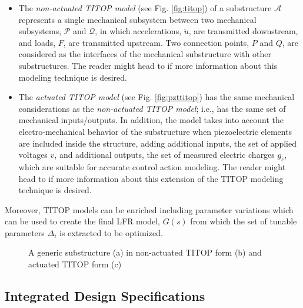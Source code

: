\documentclass{ifacconf}
\begin{document}
\begin{itemize}
\item The \emph{non-actuated TITOP model} (see Fig. \ref{fig:titop}) of a substructure $\mathcal{A}$ represents a single mechanical subsystem between two mechanical subsystems, $\mathcal{P}$ and $\mathcal{Q}$, in which accelerations, $\ddot{u}$, are transmitted downstream, and loads, $F$, are transmitted upstream. Two connection points, $P$ and $Q$, are considered as the interfaces of the mechanical substructure with other substructures. The reader might head to \cite{Perez2015_LM} if more information about this modeling technique is desired.

\item The \emph{actuated TITOP model} (see Fig. \ref{fig:pzttitop}) has the same mechanical considerations as the \emph{non-actuated TITOP model}; i.e., has the same set of mechanical inputs/outputs. In addition, the model takes into account the electro-mechanical behavior of the substructure when piezoelectric elements are included inside the structure, adding additional inputs, the set of applied voltages $v$, and additional outputs, the set of measured electric charges $g_c$, which are suitable for accurate control action modeling. The reader might head to \cite{Perez2016_PEA} if more information about this extension of the TITOP modeling technique is desired.
\end{itemize}

Moreover, TITOP models can be enriched including parameter variations which can be used to create the final LFR model, $G(s)$ from which the set of tunable parameters $\Delta_i$ is extracted to be optimized.

\begin{figure}
\centering
{}
\hfill
\begin{minipage}{.48\linewidth}
\centering
{}
\end{minipage}\begin{minipage}{.48\linewidth}
\centering
{}
\end{minipage}
\caption{A generic substructure (a) in non-actuated TITOP form (b) and actuated TITOP form (c)}
\label{fig:main}
\end{figure}

\subsection{Integrated Design Specifications}
\label{subsec:IDspec}
\end{document}
